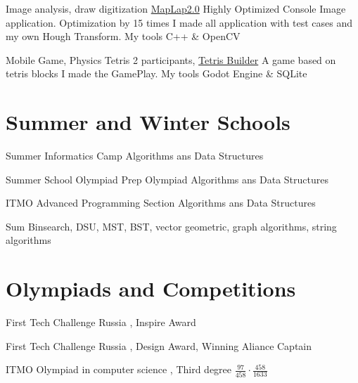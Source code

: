 \documentclass[12pt,a4paper]{moderncv}
\begin{document}
         {Image analysis, draw digitization} {\textcolor{blue} {\href{https://github.com/a-alex-l/MapLap_2} {MapLap2.0}}} {\newline Highly Optimized Console Image application. Optimization by 15 times}{} {I made all application with test cases and my own Hough Transform. My tools \textcolor{Attention} {C++ \& OpenCV} }
        
         {Mobile Game, Physics Tetris} {2 participants, \textcolor{blue} {\href{https://github.com/a-alex-l/TetrisBuilder} {Tetris Builder}}} {\newline A game based on tetris blocks}{} {I made the GamePlay. My tools \textcolor{Attention} {Godot Engine \& SQLite} }
        
    \section{Summer and Winter Schools}
        
         {Summer Informatics Camp} {}{} {Algorithms ans Data Structures} {}
        
         {Summer School Olympiad Prep} {}{} {Olympiad Algorithms ans Data Structures} {}
        
         {ITMO Advanced Programming Section} {}{} {Algorithms ans Data Structures} {}
        
        \cventry{} {Sum} {}{} {Binsearch, DSU, MST, BST, vector geometric, graph algorithms, string algorithms} {}
    
    \section{Olympiads and Competitions}
    
         {First Tech Challenge Russia} {}{} {\textcolor{blue} {}, \textcolor{Attention} {Inspire Award}} {}
        
         {First Tech Challenge Russia} {}{} {\textcolor{blue} {}, \textcolor{Attention} {Design Award}, \textcolor{Attention} {Winning Aliance Captain}} {}
        
         {ITMO Olympiad in computer science} {}{} {\textcolor{blue} {}, Third degree \textcolor{blue} {} $\frac{97} {458} \cdot \frac{458} {1633}$} {}
        
\end{document}
